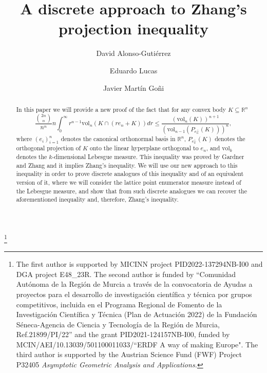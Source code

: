 \documentclass[10pt]{amsart}
\def\R{\mathbb{R}}
\def\vol{\mathrm{vol}}
\numberwithin{equation}{section}
\begin{document}
\title{A discrete approach to Zhang's projection inequality}

\author{David Alonso-Guti\'errez}
\address{\'Area de an\'alisis matem\'atico, Departamento de matem\'aticas, Facultad de Ciencias, Universidad de Zaragoza, C/ Pedro cerbuna 12, 50009 Zaragoza (Spain), IUMA}
\author{Eduardo Lucas}
\address{Departamento de Matem�ticas, Universidad de Murcia, Campus de Espinardo, 30100 Murcia, Spain.}
\author{Javier Mart\'in Go\~ni}
\address{\'Area de an\'alisis matem\'atico, Departamento de matem\'aticas, Facultad de Ciencias, Universidad de Zaragoza, C/ Pedro cerbuna 12, 50009 Zaragoza (Spain), IUMA and Faculty of Computer Science and Mathematics, University of Passau, Innstrasse 33, 94032 Passau, Germany}


\thanks{The first author is supported by MICINN project PID2022-137294NB-I00 and DGA project E48\_23R. The second author is funded by ``Comunidad Aut\'onoma de la Regi\'on de Murcia a trav\'es de la convocatoria de Ayudas a proyectos para el desarrollo de investigaci\'on cient\'ifica y t\'ecnica por grupos competitivos, incluida en el Programa Regional de Fomento de la Investigaci\'on Cient\'ifica y T\'ecnica (Plan de Actuaci\'on 2022) de la Fundaci\'on S\'eneca-Agencia de Ciencia y Tecnolog\'ia de la Regi\'on de Murcia, Ref.21899/PI/22'' and the grant PID2021-124157NB-I00, funded by MCIN/AEI/10.13039/501100011033/``ERDF A way of making Europe". The third author is supported by the Austrian Science Fund (FWF) Project P32405 \textit{Asymptotic Geometric Analysis and Applications.}}




\begin{abstract}
In this paper we will provide a new proof of the fact that for any convex body $K\subseteq\R^n$
$$
\frac{{{2n}\choose{n}}}{n^n}n\int_0^\infty r^{n-1}\vol_n(K\cap(re_n+K))dr\leq\frac{(\vol_n(K))^{n+1}}{(\vol_{n-1}(P_{e_n^\perp}(K)))^n},
$$
where $(e_i)_{i=1}^n$ denotes the canonical orthonormal basis in $\R^n$, $P_{e_n^\perp}(K)$ denotes the orthogonal projection of $K$ onto the linear hyperplane orthogonal to $e_n$, and $\vol_k$ denotes the $k$-dimensional Lebesgue measure. This inequality was proved by Gardner and Zhang and it implies Zhang's inequality. We will use our new approach to this inequality in order to prove discrete analogues of this inequality and of an equivalent version of it, where we will consider the lattice point enumerator measure instead of the Lebesgue measure, and show that from such discrete analogues we can recover the aforementioned inequality and, therefore, Zhang's inequality.
\end{abstract}
\end{document}
